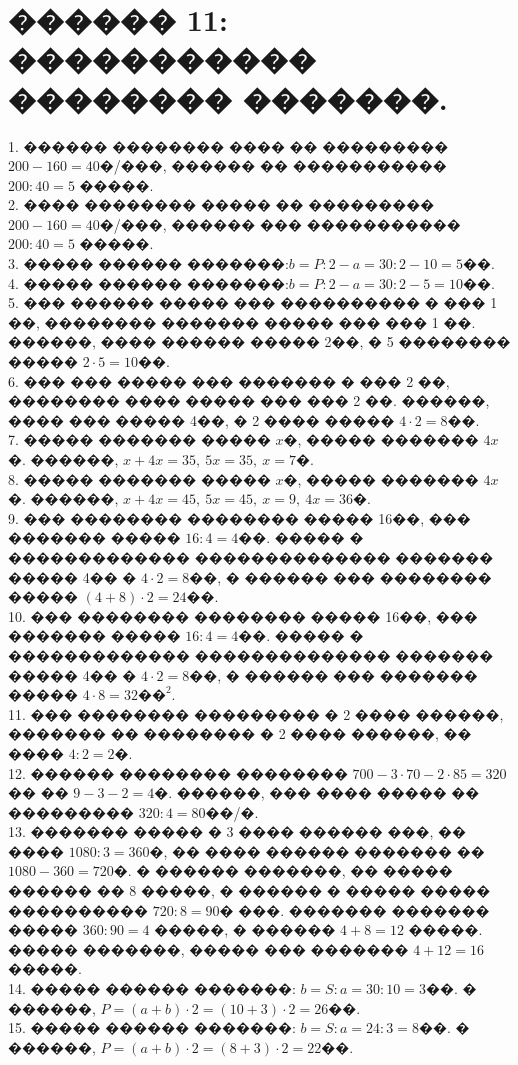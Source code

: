 \documentclass[12pt]{article}
\begin{document}
\section{������ 11: ����������� �������� �������.}
1. ������ �������� ���� �� ��������� $200-160=40$�/���, ������ �� ����������� $200:40=5$ �����.\\
2. ���� �������� ����� �� ��������� $200-160=40$�/���, ������ ��� ����������� $200:40=5$ �����.\\
3. ����� ������ �������:$b=P:2-a=30:2-10=5$��.\\
4. ����� ������ �������:$b=P:2-a=30:2-5=10$��.\\
5. ��� ������ ����� ��� ���������� � ��� 1 ��, �������� ������� ����� ��� ��� 1 ��. ������, ���� ������ ����� 2��, � 5 �������� ����� $2\cdot5=10$��.\\
6. ��� ��� ����� ��� ������� � ��� 2 ��, �������� ���� ����� ��� ��� 2 ��. ������, ���� ��� ����� 4��, � 2 ���� ����� $4\cdot2=8$��.\\
7. ����� ������� ����� $x$�, ����� ������� $4x$�. ������, $x+4x=35,\ 5x=35,\ x=7$�.\\
8. ����� ������� ����� $x$�, ����� ������� $4x$�. ������, $x+4x=45,\ 5x=45,\ x=9,\ 4x=36$�.\\
9. ��� �������� �������� ����� 16��, ��� ������� ����� $16:4=4$��. ����� � ������������� �������������� ������� ����� 4�� � $4\cdot2=8$��, � ������ ��� ��������
����� $(4+8)\cdot2=24$��.\\
10. ��� �������� �������� ����� 16��, ��� ������� ����� $16:4=4$��. ����� � ������������� �������������� ������� ����� 4�� � $4\cdot2=8$��, � ������ ���
������� ����� $4\cdot8=32\text{��}^2.$\\
11. ��� �������� ��������� � 2 ���� ������, ������� �� �������� � 2 ���� ������, �� ���� $4:2=2$�.\\
12. ������ �������� �������� $700-3\cdot70-2\cdot85=320$�� �� $9-3-2=4$�. ������, ��� ���� ����� �� ��������� $320:4=80$��/�.\\
13. ������� ����� � 3 ���� ������ ���, �� ���� $1080:3=360$�, �� ���� ������ ������� �� $1080-360=720$�. � ������ �������, �� ����� ������ �� 8 �����, � ������ � ����� ����� ���������� $720:8=90$� ���. ������� ������� ����� $360:90=4$ �����, � ������ $4+8=12$ �����. ����� �������, ����� ��� ������� $4+12=16$ �����.\\
14. ����� ������ �������: $b=S:a=30:10=3$��. � ������, $P=(a+b)\cdot2=(10+3)\cdot2=26$��.\\
15. ����� ������ �������: $b=S:a=24:3=8$��. � ������, $P=(a+b)\cdot2=(8+3)\cdot2=22$��.\\
\end{document}
